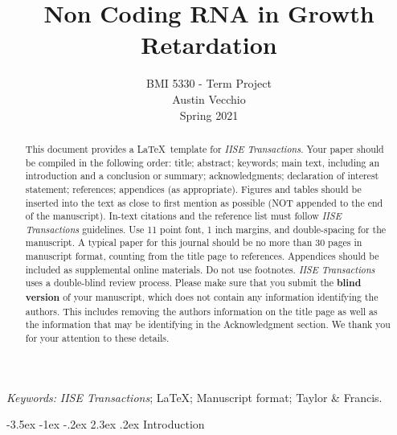 \documentclass[11pt]{article}
\makeatletter
\renewcommand\section{\@startsection {section}{1}{\z@}%
                                       {-3.5ex \@plus -1ex \@minus -.2ex}%
                                       {2.3ex \@plus.2ex}%
                                       {\normalfont\fontfamily{phv}\fontsize{16}{19}\bfseries}}
\makeatother
\begin{document}
		
		\def\spacingset#1{\renewcommand{\baselinestretch}%
			{#1}\small\normalsize} \spacingset{1}
		
    \title{Non Coding RNA in Growth Retardation}
    \author{BMI 5330 - Term Project \\
    Austin Vecchio \\
    Spring 2021 }
    \date{}
    \maketitle
		
		
	\begin{abstract}
This document provides a \LaTeX \ template for \emph{IISE Transactions}. Your paper should be compiled in the following order: title; abstract; keywords; main text, including an introduction and a conclusion or summary; acknowledgments; declaration of interest statement; references; appendices (as appropriate). Figures and tables should be inserted into the text as close to first mention as possible (NOT appended to the end of the manuscript). In-text citations and the reference list must follow \emph{IISE Transactions} guidelines. Use 11 point font, 1 inch margins, and double-spacing for the manuscript. A typical paper for this journal should be no more than 30 pages in manuscript format, counting from the title page to references. Appendices should be included as supplemental online materials. Do not use footnotes. \emph{IISE Transactions} uses a double-blind review process. Please make sure that you submit the \textbf{blind version} of your manuscript, which does not contain any information identifying the authors.  This includes removing the authors information on the title page as well as the information that may be identifying in the Acknowledgment section. We thank you for your attention to these details.
	\end{abstract}
			
	\noindent%
	{\it Keywords:} \emph{IISE Transactions}; \LaTeX; Manuscript format; Taylor \& Francis.

	\spacingset{1.5} %


\section{Introduction} \label{s:intro}
\end{document}
